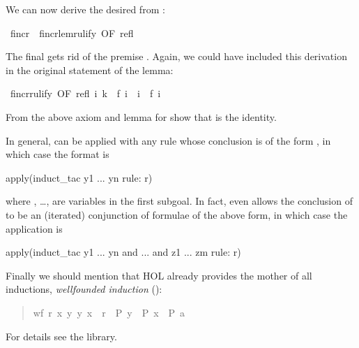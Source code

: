 \begin{isabelle}
\begin{isamarkuptext}
We can now derive the desired  from :%
\end{isamarkuptext}%
\ f{\isacharunderscore}incr\ {\isacharequal}\ f{\isacharunderscore}incr{\isacharunderscore}lem{\isacharbrackleft}rulify{\isacharcomma}\ OF\ refl{\isacharbrackright}%
\begin{isamarkuptext}%
The final  gets rid of the premise . Again, we could
have included this derivation in the original statement of the lemma:%
\end{isamarkuptext}%
\ f{\isacharunderscore}incr{\isacharbrackleft}rulify{\isacharcomma}\ OF\ refl{\isacharbrackright}{\isacharcolon}\ {\isachardoublequote}{\isasymforall}i{\isachardot}\ k\ {\isacharequal}\ f\ i\ {\isasymlongrightarrow}\ i\ {\isasymle}\ f\ i{\isachardoublequote}%
\begin{isamarkuptext}%
\begin{exercise}
From the above axiom and lemma for  show that  is the identity.
\end{exercise}

In general,  can be applied with any rule 
whose conclusion is of the form , in which case the
format is
\begin{ttbox}
apply(induct_tac y1 ... yn rule: r)
\end{ttbox}%
where , \dots,  are variables in the first subgoal.
In fact,  even allows the conclusion of
 to be an (iterated) conjunction of formulae of the above form, in
which case the application is
\begin{ttbox}
apply(induct_tac y1 ... yn and ... and z1 ... zm rule: r)
\end{ttbox}

Finally we should mention that HOL already provides the mother of all
inductions, \emph{wellfounded induction} ():
\begin{quote}

\begin{isabelle}%
{\isasymlbrakk}wf\ \mbox{{\isacharquery}r}{\isacharsemicolon}\ {\isasymAnd}\mbox{x}{\isachardot}\ {\isasymforall}\mbox{y}{\isachardot}\ {\isacharparenleft}\mbox{y}{\isacharcomma}\ \mbox{x}{\isacharparenright}\ {\isasymin}\ \mbox{{\isacharquery}r}\ {\isasymlongrightarrow}\ \mbox{{\isacharquery}P}\ \mbox{y}\ {\isasymLongrightarrow}\ \mbox{{\isacharquery}P}\ \mbox{x}{\isasymrbrakk}\ {\isasymLongrightarrow}\ \mbox{{\isacharquery}P}\ \mbox{{\isacharquery}a}
\end{isabelle}%

\end{quote}
For details see the library.%
\end{isamarkuptext}%
\end{isabelle}%

